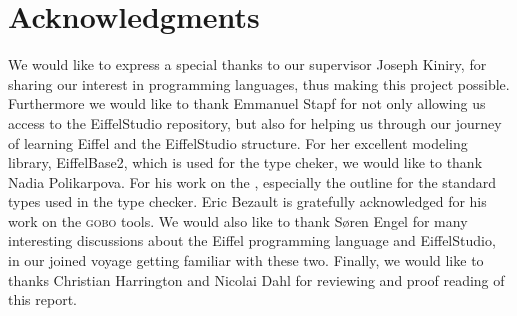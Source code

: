 \section{Acknowledgments}
We would like to express a special thanks to our supervisor Joseph Kiniry, for sharing our interest in programming languages, thus making this project possible. Furthermore we would like to thank Emmanuel Stapf for not only allowing us access to the EiffelStudio repository, but also for helping us through our journey of learning Eiffel and the EiffelStudio structure. For her excellent modeling library, EiffelBase2, which is used for the type cheker, we would like to thank Nadia Polikarpova. For his work on the , especially the outline for the standard \bon{} types used in the type checker. Eric Bezault is gratefully acknowledged for his work on the \textsc{gobo} tools. We would also like to thank S\o ren Engel for many interesting discussions about the Eiffel programming language and EiffelStudio, in our joined voyage getting familiar with these two. Finally, we would like to thanks Christian Harrington and Nicolai Dahl for reviewing and proof reading of this report.